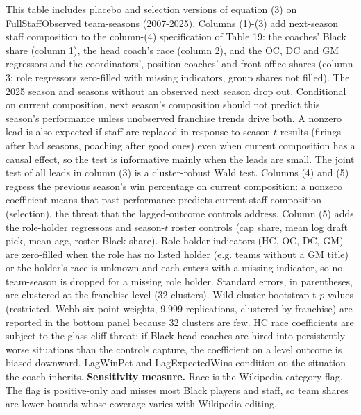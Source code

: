 \begin{table}[!h]
{\begin{threeparttable}
\begin{tablenotes}[para]
\item This table includes placebo and selection versions of equation (3) on FullStaffObserved team-seasons (2007-2025). Columns (1)-(3) add next-season staff composition to the column-(4) specification of Table 19: the coaches' Black share (column 1), the head coach's race (column 2), and the OC, DC and GM regressors and the coordinators', position coaches' and front-office shares (column 3; role regressors zero-filled with missing indicators, group shares not filled). The 2025 season and seasons without an observed next season drop out. Conditional on current composition, next season's composition should not predict this season's performance unless unobserved franchise trends drive both. A nonzero lead is also expected if staff are replaced in response to season-$t$ results (firings after bad seasons, poaching after good ones) even when current composition has a causal effect, so the test is informative mainly when the leads are small. The joint test of all leads in column (3) is a cluster-robust Wald test. Columns (4) and (5) regress the previous season's win percentage on current composition: a nonzero coefficient means that past performance predicts current staff composition (selection), the threat that the lagged-outcome controls address. Column (5) adds the role-holder regressors and season-$t$ roster controls (cap share, mean log draft pick, mean age, roster Black share). Role-holder indicators (HC, OC, DC, GM) are zero-filled when the role has no listed holder (e.g. teams without a GM title) or the holder's race is unknown and each enters with a missing indicator, so no team-season is dropped for a missing role holder. Standard errors, in parentheses, are clustered at the franchise level (32 clusters). Wild cluster bootstrap-t $p$-values (restricted, Webb six-point weights, 9,999 replications, clustered by franchise) are reported in the bottom panel because 32 clusters are few. HC race coefficients are subject to the glass-cliff threat: if Black head coaches are hired into persistently worse situations than the controls capture, the coefficient on a level outcome is biased downward. LagWinPct and LagExpectedWins condition on the situation the coach inherits. \textbf{Sensitivity measure.} Race is the Wikipedia category flag. The flag is positive-only and misses most Black players and staff, so team shares are lower bounds whose coverage varies with Wikipedia editing.
\end{tablenotes}
\end{threeparttable}}
\end{table}
